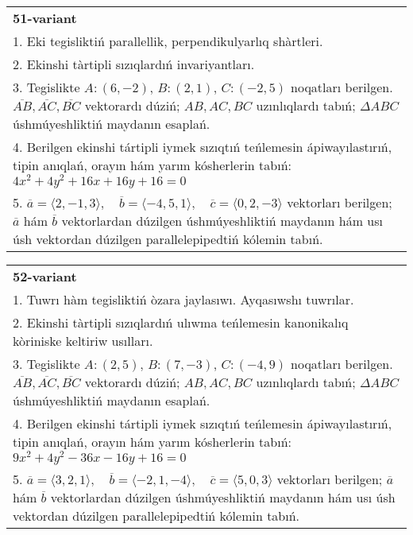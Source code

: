 \documentclass{article}
\begin{document}
\begin{tabular}{m{17cm}}
\textbf{51-variant}\\
1. Eki tegisliktiń parallellik, perpendikulyarlıq shàrtleri.\\

2. Ekinshi tàrtipli sızıqlardıń invariyantları.\\

3. Tegislikte $A: (6, -2)$, $B: (2, 1)$, $C: (-2, 5)$ noqatları berilgen. $\overline{AB}, \overline{AC}, \overline{BC}$ vektorardı dúziń; $AB, AC, BC$ uzınlıqlardı tabıń; $\Delta ABC$ úshmúyeshliktiń maydanın esaplań. \\

4. Berilgen ekinshi tártipli iymek sızıqtıń teńlemesin ápiwayılastırıń, tipin anıqlań, orayın hám yarım kósherlerin tabıń: $4x^2+4y^2+16x+16y+16=0$\\

5. \(\overline{a} = \langle 2, -1, 3 \rangle, \quad \overline{b} = \langle -4, 5, 1 \rangle, \quad \overline{c} = \langle 0, 2, -3 \rangle\) vektorları berilgen; \(\overline{a}\) hám \(\overline{b}\) vektorlardan dúzilgen úshmúyeshliktiń maydanın hám usı úsh vektordan dúzilgen parallelepipedtiń kólemin tabıń.
\end{tabular}
\vspace{1cm}


\begin{tabular}{m{17cm}}
\textbf{52-variant}\\
1. Tuwrı hàm tegisliktiń òzara jaylasıwı. Ayqasıwshı tuwrılar.\\

2. Ekinshi tàrtipli sızıqlardıń ulıwma teńlemesin kanonikalıq kòriniske keltiriw usılları.\\

3. Tegislikte $A: (2, 5)$, $B: (7, -3)$, $C: (-4, 9)$ noqatları berilgen. $\overline{AB}, \overline{AC}, \overline{BC}$ vektorardı dúziń; $AB, AC, BC$ uzınlıqlardı tabıń; $\Delta ABC$ úshmúyeshliktiń maydanın esaplań. \\

4. Berilgen ekinshi tártipli iymek sızıqtıń teńlemesin ápiwayılastırıń, tipin anıqlań, orayın hám yarım kósherlerin tabıń: $9x^2+4y^2-36x-16y+16=0$\\

5. \(\overline{a} = \langle 3, 2, 1 \rangle, \quad \overline{b} = \langle -2, 1, -4 \rangle, \quad \overline{c} = \langle 5, 0, 3 \rangle\) vektorları berilgen; \(\overline{a}\) hám \(\overline{b}\) vektorlardan dúzilgen úshmúyeshliktiń maydanın hám usı úsh vektordan dúzilgen parallelepipedtiń kólemin tabıń.
\end{tabular}
\vspace{1cm}
\end{document}
